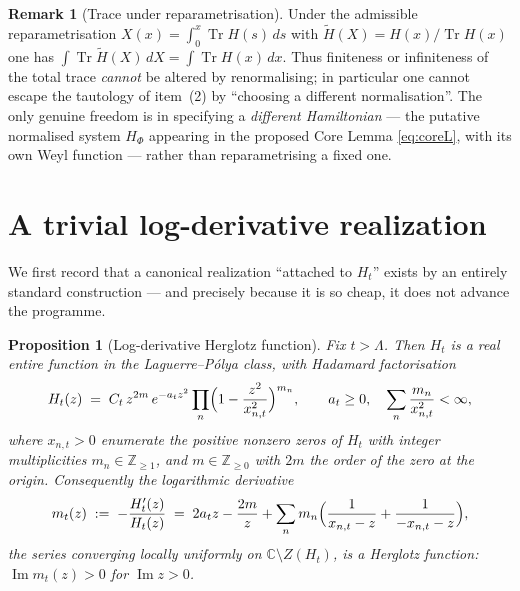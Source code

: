 \documentclass[12pt,a4paper]{amsart}
\theoremstyle{plain}
\newtheorem{proposition}[theorem]{Proposition}
\theoremstyle{definition}
\newtheorem{remark}[theorem]{Remark}
\newcommand{\Tr}{\operatorname{Tr}}
\newcommand{\Ham}{H}
\begin{document}
\begin{remark}[Trace under reparametrisation]\label{rem:invariance}
  Under the admissible reparametrisation $X(x)=\int_0^x \Tr\Ham(s)\,ds$
  with $\widetilde\Ham(X)=\Ham(x)/\Tr\Ham(x)$ one has
  $\int \Tr\widetilde\Ham(X)\,dX = \int \Tr\Ham(x)\,dx$.  Thus finiteness
  or infiniteness of the total trace \emph{cannot} be altered by
  renormalising; in particular one cannot escape the tautology of item~(2)
  by ``choosing a different normalisation''.  The only genuine freedom is
  in specifying a \emph{different Hamiltonian} --- the putative normalised
  system $\Ham_\Phi$ appearing in the proposed Core Lemma
  \cref{eq:coreL}, with its own Weyl function --- rather than
  reparametrising a fixed one.
\end{remark}


\section{A trivial log-derivative realization}
\label{sec:trivial}

We first record that a canonical realization ``attached to $H_t$'' exists
by an entirely standard construction --- and precisely because it is so
cheap, it does not advance the programme.

\begin{proposition}[Log-derivative Herglotz function]\label{prop:trivial}
  Fix $t > \Lambda$.  Then $H_t$ is a real entire function in the
  Laguerre--P\'olya class, with Hadamard factorisation
  \begin{equation}\label{eq:hadamard}
    H_t(z) \;=\; C_t\, z^{2m}\, e^{-a_t z^2}
      \prod_{n}\Bigl(1 - \frac{z^2}{x_{n,t}^2}\Bigr)^{m_n},
    \qquad a_t \ge 0,\quad \sum_n \frac{m_n}{x_{n,t}^2} < \infty,
  \end{equation}
  where $x_{n,t}>0$ enumerate the \emph{positive} nonzero zeros of $H_t$
  with integer multiplicities $m_n\in\mathbb Z_{\ge1}$, and
  $m\in\mathbb Z_{\ge0}$ with $2m$ the order of the zero at the origin.
  Consequently the logarithmic derivative
  \begin{equation}\label{eq:mt}
    m_t(z) \;:=\; -\frac{H_t'(z)}{H_t(z)}
      \;=\; 2a_t z - \frac{2m}{z}
        + \sum_n m_n\Bigl(\frac{1}{x_{n,t}-z} + \frac{1}{-x_{n,t}-z}\Bigr),
  \end{equation}
  the series converging locally uniformly on
  $\mathbb C\setminus Z(H_t)$, is a Herglotz function:
  $\operatorname{Im}m_t(z) > 0$ for $\operatorname{Im}z > 0$.
\end{proposition}
\end{document}
